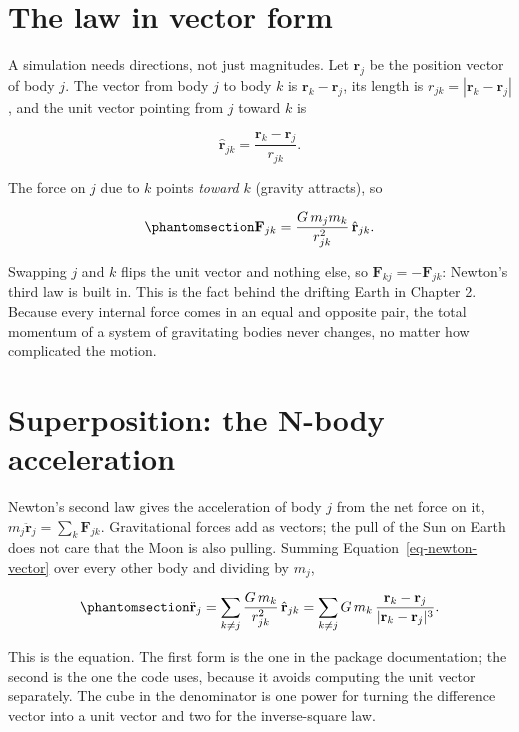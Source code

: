 \documentclass[
  10.5pt,
  letterpaper,
]{scrbook}
\theoremstyle{plain}
\theoremstyle{remark}
\begin{document}
\section{The law in vector form}\label{the-law-in-vector-form}

A simulation needs directions, not just magnitudes. Let \(\mathbf{r}_j\)
be the position vector of body \(j\). The vector from body \(j\) to body
\(k\) is \(\mathbf{r}_k - \mathbf{r}_j\), its length is
\(r_{jk} = |\mathbf{r}_k - \mathbf{r}_j|\), and the unit vector pointing
from \(j\) toward \(k\) is

\[
\hat{\mathbf{r}}_{jk} = \frac{\mathbf{r}_k - \mathbf{r}_j}{r_{jk}}.
\]

The force on \(j\) due to \(k\) points \emph{toward} \(k\) (gravity
attracts), so

\begin{equation}\protect\phantomsection\label{eq-newton-vector}{
\mathbf{F}_{jk} = \frac{G\,m_j m_k}{r_{jk}^2}\,\hat{\mathbf{r}}_{jk}.
}\end{equation}

Swapping \(j\) and \(k\) flips the unit vector and nothing else, so
\(\mathbf{F}_{kj} = -\mathbf{F}_{jk}\): Newton's third law is built in.
This is the fact behind the drifting Earth in Chapter 2. Because every
internal force comes in an equal and opposite pair, the total momentum
of a system of gravitating bodies never changes, no matter how
complicated the motion.

\section{Superposition: the N-body
acceleration}\label{superposition-the-n-body-acceleration}

Newton's second law gives the acceleration of body \(j\) from the net
force on it, \(m_j \ddot{\mathbf{r}}_j = \sum_k \mathbf{F}_{jk}\).
Gravitational forces add as vectors; the pull of the Sun on Earth does
not care that the Moon is also pulling. Summing
Equation~\ref{eq-newton-vector} over every other body and dividing by
\(m_j\),

\begin{equation}\protect\phantomsection\label{eq-nbody}{
\ddot{\mathbf{r}}_j = \sum_{k \neq j} \frac{G\,m_k}{r_{jk}^2}\,\hat{\mathbf{r}}_{jk}
= \sum_{k \neq j} G\,m_k\,\frac{\mathbf{r}_k - \mathbf{r}_j}{|\mathbf{r}_k - \mathbf{r}_j|^3}.
}\end{equation}

This is the equation. The first form is the one in the package
documentation; the second is the one the code uses, because it avoids
computing the unit vector separately. The cube in the denominator is one
power for turning the difference vector into a unit vector and two for
the inverse-square law.
\end{document}
